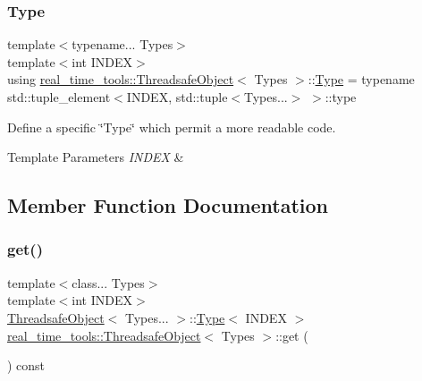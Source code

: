 \subsubsection{\texorpdfstring{Type}{Type}}
{\footnotesize\ttfamily template$<$typename... Types$>$ \\
template$<$int I\+N\+D\+EX$>$ \\
using \hyperlink{classreal__time__tools_1_1ThreadsafeObject}{real\+\_\+time\+\_\+tools\+::\+Threadsafe\+Object}$<$ Types $>$\+::\hyperlink{classreal__time__tools_1_1ThreadsafeObject_afcbd77df1964d4fe606f1e776f1ff9b8}{Type} =  typename std\+::tuple\+\_\+element$<$I\+N\+D\+EX, std\+::tuple$<$Types...$>$ $>$\+::type}



Define a specific \char`\"{}\+Type\char`\"{} which permit a more readable code. 


\begin{DoxyTemplParams}{Template Parameters}
{\em I\+N\+D\+EX} & \\
\hline
\end{DoxyTemplParams}


\subsection{Member Function Documentation}
\mbox{\label{classreal__time__tools_1_1ThreadsafeObject_a1d0b19b1ddbeb9c4c2ea93551ce05841}} 
\subsubsection{\texorpdfstring{get()}{get()}}
{\footnotesize\ttfamily template$<$class... Types$>$ \\
template$<$int I\+N\+D\+EX$>$ \\
\hyperlink{classreal__time__tools_1_1ThreadsafeObject}{Threadsafe\+Object}$<$ Types... $>$\+::\hyperlink{classreal__time__tools_1_1ThreadsafeObject_afcbd77df1964d4fe606f1e776f1ff9b8}{Type}$<$ I\+N\+D\+EX $>$ \hyperlink{classreal__time__tools_1_1ThreadsafeObject}{real\+\_\+time\+\_\+tools\+::\+Threadsafe\+Object}$<$ Types $>$\+::get (\begin{DoxyParamCaption}{ }\end{DoxyParamCaption}) const}



